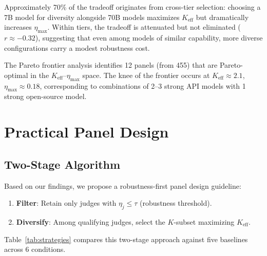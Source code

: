 \documentclass[11pt,a4paper]{article}
\begin{document}
Approximately 70\% of the tradeoff originates from cross-tier selection: choosing a 7B model for diversity alongside 70B models maximizes $K_{\text{eff}}$ but dramatically increases $\eta_{\max}$. Within tiers, the tradeoff is attenuated but not eliminated ($r \approx -0.32$), suggesting that even among models of similar capability, more diverse configurations carry a modest robustness cost.

The Pareto frontier analysis identifies 12 panels (from 455) that are Pareto-optimal in the $K_{\text{eff}}$--$\eta_{\max}$ space. The knee of the frontier occurs at $K_{\text{eff}} \approx 2.1$, $\eta_{\max} \approx 0.18$, corresponding to combinations of 2--3 strong API models with 1 strong open-source model.

\section{Practical Panel Design}
\label{sec:design}

\subsection{Two-Stage Algorithm}

Based on our findings, we propose a robustness-first panel design guideline:
\begin{enumerate}
    \item \textbf{Filter}: Retain only judges with $\eta_j \leq \tau$ (robustness threshold).
    \item \textbf{Diversify}: Among qualifying judges, select the $K$-subset maximizing $K_{\text{eff}}$.
\end{enumerate}

Table~\ref{tab:strategies} compares this two-stage approach against five baselines across 6 conditions.
\end{document}
